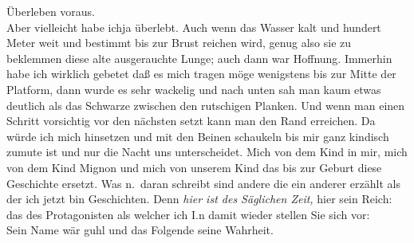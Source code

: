 \documentclass[
]{article}
\begin{document}
Überleben voraus.\\
Aber vielleicht habe ichja überlebt. Auch wenn das Wasser kalt und
hundert Meter weit und bestimmt bis zur Brust reichen wird, genug also
sie zu beklemmen diese alte ausgerauchte Lunge; auch dann war Hoffnung.
Immerhin habe ich wirklich gebetet daß es mich tragen möge wenigstens
bis zur Mitte der Platform, dann wurde es sehr wackelig und nach unten
sah man kaum etwas deutlich als das Schwarze zwischen den rutschigen
Planken. Und wenn man einen Schritt vorsichtig vor den nächsten setzt
kann man den Rand erreichen. Da würde ich mich hinsetzen und mit den
Beinen schaukeln bis mir ganz kindisch zumute ist und nur die Nacht uns
unterscheidet. Mich von dem Kind in mir, mich von dem Kind Mignon und
mich von unserem Kind das bis zur Geburt diese Geschichte ersetzt. Was
n.~daran schreibt sind andere die ein anderer erzählt als der ich jetzt
bin Geschichten. Denn \emph{hier ist des Säglichen Zeit,} hier sein
Reich: das des Protagonisten als welcher ich I.n damit wieder stellen
Sie sich vor:\\
Sein Name wär guhl und das Folgende seine Wahrheit.
\end{document}
